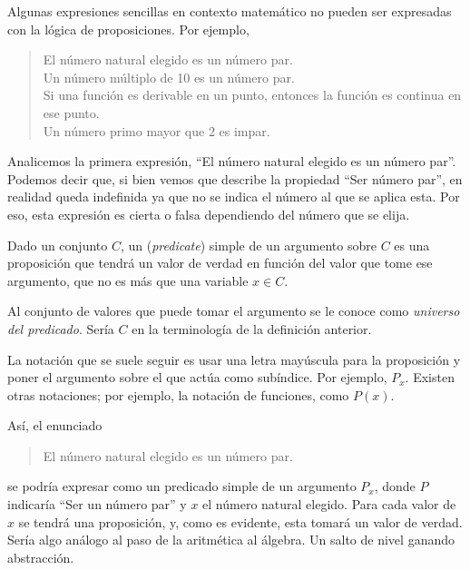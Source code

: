 



Algunas expresiones sencillas en contexto matemático no pueden ser
expresadas con la lógica de proposiciones. Por ejemplo,

\begin{quote}
  El número natural elegido es un número par. \\
  Un número múltiplo de 10 es un número par. \\
  Si una función es derivable en un punto, entonces la función es continua
    en ese punto. \\
  Un número primo mayor que 2 es impar. \\
\end{quote}

Analicemos la primera expresión, ``El número natural elegido es un número
par''. Podemos decir que, si bien vemos que describe la propiedad ``Ser
número par'', en realidad queda indefinida ya que no se indica el número al
que se aplica esta. Por eso, esta expresión es cierta o falsa dependiendo
del número que se elija.

\begin{deffinition}
  Dado un conjunto $C$, un  (\emph{predicate}) simple de un
  argumento sobre $C$ es una proposición que tendrá un valor de verdad en
  función del valor que tome ese argumento, que no es más que una variable
  $x \in C$.
\end{deffinition}

Al conjunto de valores que puede tomar el argumento se le conoce como
\emph{universo del predicado}. Sería $C$ en la terminología de la definición
anterior.

La notación que se suele seguir es usar una letra mayúscula para la
proposición y poner el argumento sobre el que actúa como subíndice. Por
ejemplo, $P_x$. Existen otras notaciones; por ejemplo, la notación de
funciones, como $P(x)$.

Así, el enunciado

\begin{quote}
  El número natural elegido es un número par.
\end{quote}

\noindent se podría expresar como un predicado simple de un argumento $P_x$,
donde $P$ indicaría ``Ser un número par'' y $x$ el número natural elegido.
Para cada valor de $x$ se tendrá una proposición, y, como es evidente, esta
tomará un valor de verdad. Sería algo análogo al paso de la aritmética al
álgebra. Un salto de nivel ganando abstracción.\footnotemark

